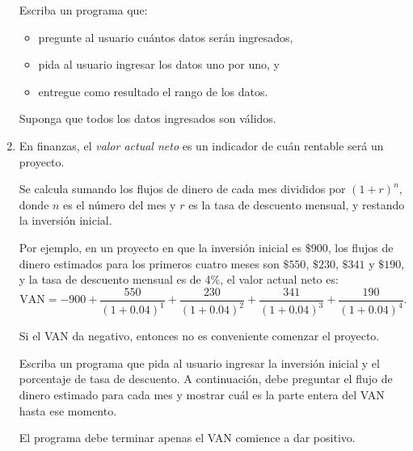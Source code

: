 \documentclass[11pt,spanish]{article}
\newcommand{\pond}[1]{[{\small\textbf{#1\%}}]}
\begin{document}
\begin{enumerate}[font=\Large\bfseries]
      \begin{minipage}[t]{.43\textwidth}
        Escriba un programa que:
        \begin{itemize}
          \item pregunte al usuario cuántos datos serán ingresados,
          \item pida al usuario ingresar los datos uno por uno, y
          \item entregue como resultado el rango de los datos.
        \end{itemize}
        Suponga que todos los datos ingresados son válidos.
      \end{minipage}
      \hfill
      \begin{minipage}[t]{.45\textwidth}
        
      \end{minipage}

    \newpage
    \item%
      \pond{25}
      En finanzas,
      el \emph{valor actual neto} es un indicador
      de cuán rentable será un proyecto.

      Se calcula sumando
      los flujos de dinero de cada mes
      divididos por \((1 + r)^n\),
      donde \(n\) es el número del mes
      y \(r\) es la tasa de descuento mensual,
      y restando la inversión inicial.

      Por ejemplo,
      en un proyecto en que la inversión inicial es \(\$900\),
      los flujos de dinero estimados para los primeros cuatro meses son
      \(\$550\), \(\$230\), \(\$341\) y \(\$190\),
      y la tasa de descuento mensual es de 4\%,
      el valor actual neto es:
      \[
        \text{VAN} = -900 +
                     \frac{550}{(1 + 0.04)^1} +
                     \frac{230}{(1 + 0.04)^2} +
                     \frac{341}{(1 + 0.04)^3} +
                     \frac{190}{(1 + 0.04)^4}.
      \]

      Si el VAN da negativo, entonces no es conveniente comenzar el proyecto.

      \begin{minipage}[t]{.43\textwidth}
        Escriba un programa que pida al usuario ingresar la inversión inicial
        y el porcentaje de tasa de descuento.
        A continuación,
        debe preguntar el flujo de dinero estimado para cada mes
        y mostrar cuál es la parte entera del VAN hasta ese momento.

        El programa debe terminar apenas el VAN comience a dar positivo.


\end{minipage}
\end{enumerate}
\end{document}
